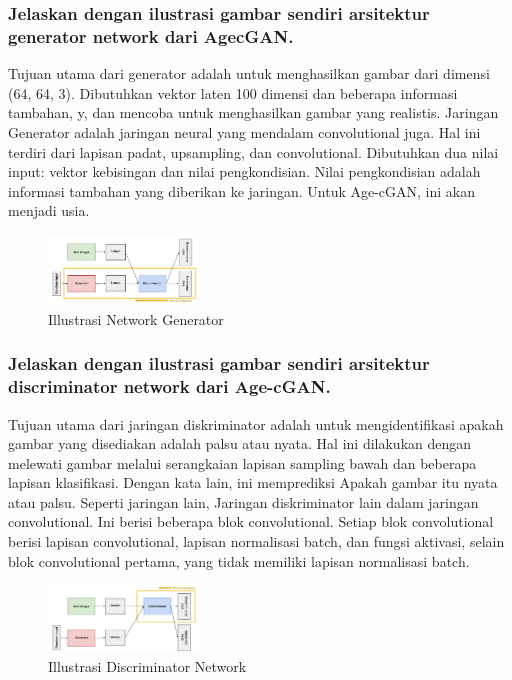 \subsubsection{Jelaskan dengan ilustrasi gambar sendiri arsitektur generator network dari AgecGAN.}
\hfill \break
Tujuan utama dari generator adalah untuk menghasilkan gambar dari dimensi (64, 64, 3). Dibutuhkan vektor laten 100 dimensi dan beberapa informasi tambahan, y, dan mencoba untuk menghasilkan gambar yang realistis. Jaringan Generator adalah jaringan neural yang mendalam convolutional juga. Hal ini terdiri dari lapisan padat, upsampling, dan convolutional. Dibutuhkan dua nilai input: vektor kebisingan dan nilai pengkondisian. Nilai pengkondisian adalah informasi tambahan yang diberikan ke jaringan. Untuk Age-cGAN, ini akan menjadi usia. 
	\begin{figure}[H]
		\includegraphics[width=4cm]{figures/1174057/chapter9/4.png}
		\centering
		\caption{Illustrasi Network Generator}
	\end{figure}

\subsubsection{Jelaskan dengan ilustrasi gambar sendiri arsitektur discriminator network dari Age-cGAN.}
\hfill \break
Tujuan utama dari jaringan diskriminator adalah untuk mengidentifikasi apakah gambar yang disediakan adalah palsu atau nyata. Hal ini dilakukan dengan melewati gambar melalui serangkaian lapisan sampling bawah dan beberapa lapisan klasifikasi. Dengan kata lain, ini memprediksi Apakah gambar itu nyata atau palsu. Seperti jaringan lain, Jaringan diskriminator lain dalam jaringan convolutional. Ini berisi beberapa blok convolutional. Setiap blok convolutional berisi lapisan convolutional, lapisan normalisasi batch, dan fungsi aktivasi, selain blok convolutional pertama, yang tidak memiliki lapisan normalisasi batch. 
	\begin{figure}[H]
		\includegraphics[width=4cm]{figures/1174057/chapter9/5.png}
		\centering
		\caption{Illustrasi Discriminator Network}
	\end{figure}
	
